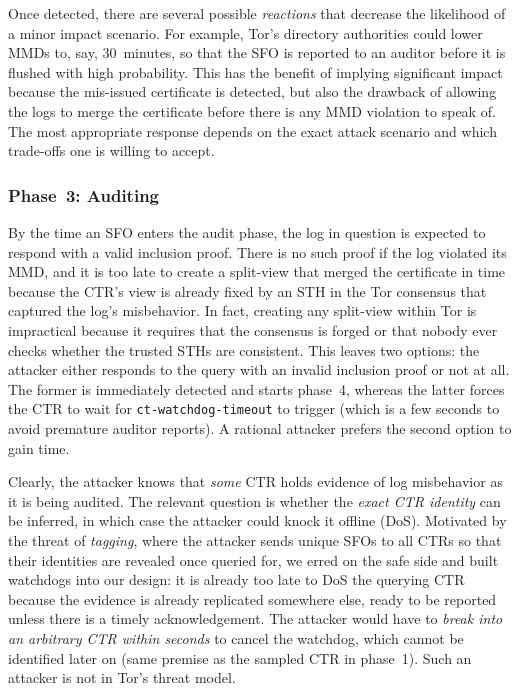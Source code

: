 Once detected, there are several possible \emph{reactions} that decrease the
likelihood of a minor impact scenario.  For example, Tor's directory
authorities could lower MMDs to, say, 30~minutes, so that the SFO is reported to
an auditor before it is flushed with high probability.  This has the benefit of
implying significant impact because the mis-issued certificate is detected, but
also the drawback of allowing the logs to merge the certificate before there is
any MMD violation to speak of.  The most appropriate response depends on the
exact attack scenario and which trade-offs one is willing to accept.

\subsubsection{Phase~3: Auditing} \label{sec:analysis:pr:phase3}
By the time an SFO enters the audit phase, the log in question is expected to
respond with a valid inclusion proof.  There is no such proof if the log
violated its MMD, and it is too late to create a split-view that merged the
certificate in time because the CTR's view is already fixed by an STH in the
Tor consensus that captured the log's misbehavior.  In fact, creating any
split-view within Tor is impractical because it requires that the consensus is
forged or that nobody ever checks whether the trusted STHs are consistent.
This leaves two options:
	the attacker either responds to the query with an invalid inclusion proof or
	not at all.
The former is immediately detected and starts phase~4, whereas the latter forces
the CTR to wait for \texttt{ct-watchdog-timeout} to trigger (which is a
few seconds to avoid premature auditor reports).  A rational attacker prefers
the second option to gain time.

Clearly, the attacker knows that \emph{some} CTR holds evidence of log
misbehavior as it is being audited.  The relevant question is whether the
\emph{exact CTR identity} can be inferred, in which case the attacker could
knock it offline (DoS).  Motivated by the threat of \emph{tagging}, where the
attacker sends unique SFOs to all CTRs so that their identities are revealed
once queried for, we erred on the safe side and built watchdogs into our design:
it is already too late to DoS the querying CTR because the evidence is already
replicated somewhere else, ready to be reported unless there is a timely
acknowledgement. The attacker would have to \emph{break into an arbitrary CTR
within seconds} to cancel the watchdog, which cannot be identified later on
(same premise as the sampled CTR in phase~1).  Such an attacker is not in Tor's
threat model.

